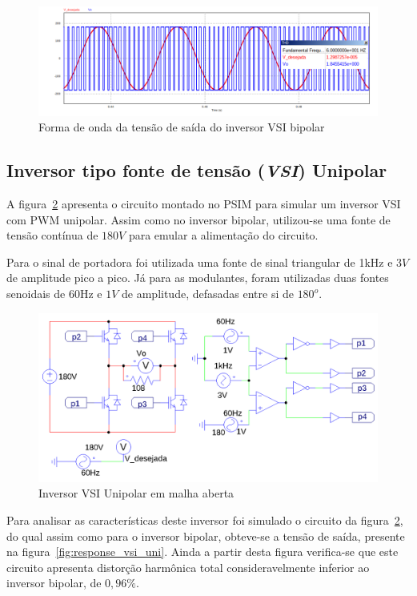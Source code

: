 \documentclass[
	12pt,				%
	openright,			%
	twoside,			%
	a4paper,			%
	english,			%
	french,				%
	spanish,			%
	brazil,				%
	]{abntex2}
\begin{document}
\begin{figure}[htbp]%
	\centering
		\includegraphics[width= \linewidth]{vsi_bip_out}
		\caption{Forma de onda da tensão de saída do inversor VSI bipolar}
		\label{fig:response_vsi_bip}
\end{figure}

\subsection{Inversor tipo fonte de tensão (\textit{VSI}) Unipolar}

A figura~\ref{fig:VSI_uni_circ} apresenta o circuito montado no PSIM para simular um inversor VSI com PWM unipolar. Assim como no inversor bipolar, utilizou-se uma fonte de tensão contínua de $180V$ para emular a alimentação do circuito.

Para o sinal de portadora foi utilizada uma fonte de sinal triangular de 1kHz e $3V$ de amplitude pico a pico. Já para as modulantes, foram utilizadas duas fontes senoidais de 60Hz e $1V$ de amplitude, defasadas entre si de $180^o$.

\begin{figure}[H]%
	\centering%
		\includegraphics[width=0.85 \linewidth]{vsi_unipolar_psim_circ}
		\caption{Inversor VSI Unipolar em malha aberta}
		\label{fig:VSI_uni_circ}
\end{figure}

Para analisar as características deste inversor foi simulado o circuito da figura~\ref{fig:VSI_uni_circ}, do qual assim como para o inversor bipolar, obteve-se a tensão de saída, presente na figura~\ref{fig:response_vsi_uni}. Ainda a partir desta figura verifica-se que este circuito apresenta distorção harmônica total consideravelmente inferior ao inversor bipolar, de $0,96\%$.
\end{document}
